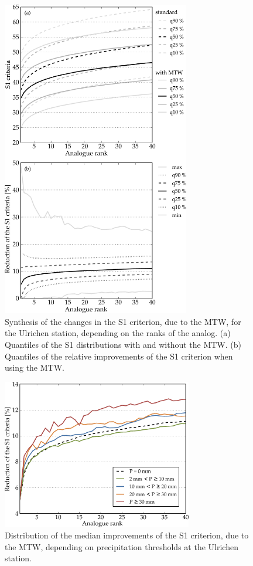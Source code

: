 \documentclass[hess, manuscript]{copernicus}
\begin{document}
\begin{figure}[htb]
	\begin{center}
		\includegraphics[width=8.2cm]{figures/changes_S1_value_and_gain.pdf}
	\end{center}
	\caption{Synthesis of the changes in the S1 criterion, due to the MTW, for the Ulrichen station, depending on the ranks of the analog. (a) Quantiles of the S1 distributions with and without the MTW. (b) Quantiles of the relative improvements of the S1 criterion when using the MTW.}
	\label{fig:changes_S1}
\end{figure}

\begin{figure}[htb]
	\begin{center}
		\includegraphics[width=8.3cm]{figures/changes_S1_precip_threshold.pdf}
	\end{center}
	\caption{Distribution of the median improvements of the S1 criterion, due to the MTW, depending on precipitation thresholds at the Ulrichen station.}
	\label{fig:changes_S1_precip_threshold}
\end{figure}
\end{document}
